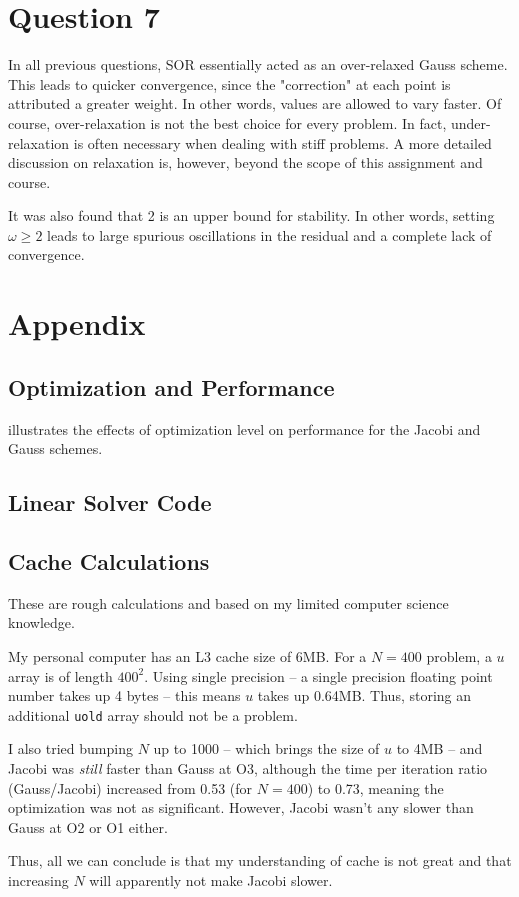 \documentclass{SelimArticle}
\begin{document}
\section{Question 7}
In all previous questions, SOR essentially acted as an over-relaxed Gauss scheme. This leads to quicker
convergence, since the "correction" at each point is attributed a greater weight.
In other words, values are allowed to vary faster. Of course, over-relaxation is not the
best choice for every problem. In fact, under-relaxation is often necessary when dealing with stiff
problems. A more detailed discussion on relaxation is, however, beyond the scope of this assignment and course.

It was also found that 2 is an upper bound for stability. In other words, setting $\omega \ge 2$ leads to
large spurious oscillations in the residual and a complete lack of convergence.

\newpage
\appendix
\section{Appendix}
\subsection{Optimization and Performance}
 illustrates the effects of optimization level on performance for the Jacobi and Gauss schemes.

\subsection{Linear Solver Code}

\subsection{Cache Calculations}
These are rough calculations and based on my limited computer science knowledge.

My personal computer has an L3 cache size of 6MB. For a $N = 400$ problem, a $u$ array is of length $400^2$.
Using single precision -- a single precision floating point number takes up 4 bytes -- this means $u$ takes up
0.64MB.  Thus, storing an additional \texttt{uold} array should not be a problem.

I also tried bumping $N$ up to 1000 -- which brings the size of $u$ to 4MB -- and Jacobi
was \textit{still} faster than Gauss at O3, although the time per iteration ratio (Gauss/Jacobi) increased
from 0.53 (for $N = 400$) to 0.73, meaning the optimization was not as significant. However, Jacobi wasn't any
slower than Gauss at O2 or O1 either.

Thus, all we can conclude is that my understanding of cache is not great and that increasing $N$ will
apparently not make Jacobi slower.
\end{document}
